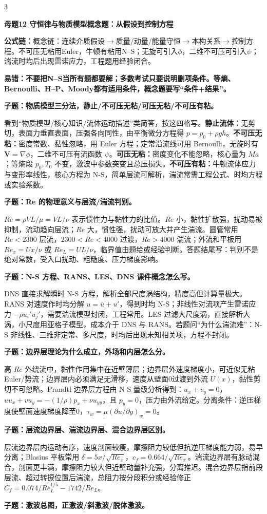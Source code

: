 \documentclass[a4paper]{article}
\newcommand{\mt}[1]{\vspace{0.22pt}\colorbox{M}{\parbox{\dimexpr\linewidth-2\fboxsep}{\color{white}\bfseries #1}}\par}
\newcommand{\qt}[1]{\vspace{0.10pt}\colorbox{Q}{\parbox{\dimexpr\linewidth-2\fboxsep}{\color{white}\bfseries #1}}\par}
\newcommand{\ans}[1]{\colorbox{G}{\parbox{\dimexpr\linewidth-2\fboxsep}{#1}}\par}
\newcommand{\warn}[1]{\colorbox{Y}{\parbox{\dimexpr\linewidth-2\fboxsep}{\color{E}\bfseries #1}}\par}
\newcommand{\form}[1]{{\color{M}\bfseries 公式链：}#1\par}
\begin{document}
\begin{multicols}{3}
\mt{母题12 守恒律与物质模型概念题：从假设到控制方程}
\form{概念链：连续介质假设$\to$质量/动量/能量守恒$\to$本构关系$\to$控制方程。不可压无粘用Euler，牛顿有粘用N--S；无旋可引入$\phi$，二维不可压可引入$\psi$；湍流时均后出现雷诺应力，工程题用经验闭合。}
\warn{易错：不要把N--S当所有题都要解；多数考试只要说明删项条件。等熵、Bernoulli、H--P、Moody都有适用条件，概念题要写“条件+结果”。}
\qt{子题：物质模型三分法，静止/不可压无粘/可压无粘/不可压有粘。}
\ans{看到“物质模型/核心知识/流体运动描述”类简答，按这四格写。\textbf{静止流体：}无剪切，表面力垂直表面，压强各向同性，由平衡微分方程得 $p=p_0+\rho gh$。\textbf{不可压无粘：}密度常数、黏性忽略，用 Euler 方程；定常沿流线可用 Bernoulli，无旋时有 $\bm V=\nabla\phi$，二维不可压有流函数 $\psi$。\textbf{可压无粘：}密度变化不能忽略，核心量为 $Ma$；等熵段 $p_0,T_0$ 不变，激波中参数突变且总压损失。\textbf{不可压有粘：}牛顿流体应力与变形率线性，核心方程为 N-S，简单层流可解析，湍流常需工程公式、时均方程或实验系数。}
\qt{子题：Re 的物理意义与层流/湍流判别。}
\ans{$Re=\rho VL/\mu=VL/\nu$ 表示惯性力与黏性力的比值。$Re$ 小，黏性扩散强，扰动易被抑制，流动趋向层流；$Re$ 大，惯性强，扰动可放大并产生湍流。圆管常用 $Re<2300$ 层流，$2300<Re<4000$ 过渡，$Re>4000$ 湍流；外流和平板用 $Re_x=Ux/\nu$ 或 $Re_L=UL/\nu$，临界值由题给或经验判断。答题结尾写：判别不是绝对常数，受入口扰动、粗糙度、压力梯度影响。}
\qt{子题：N-S 方程、RANS、LES、DNS 课件概念怎么写。}
\ans{DNS 直接求解瞬时 N-S 方程，解析全部尺度涡结构，精度高但计算量极大。RANS 对速度作时均分解 $u=\bar u+u'$，得到时均 N-S；非线性对流项产生雷诺应力 $-\rho\overline{u_i'u_j'}$，需要湍流模型封闭，工程常用。LES 过滤大尺度涡，直接解析大涡，小尺度用亚格子模型，成本介于 DNS 与 RANS。若题问“为什么湍流难”：N-S 非线性、三维非定常、多尺度，时均后出现未知相关项，方程不封闭。}
\qt{子题：边界层理论为什么成立，外场和内层怎么分。}
\ans{高 $Re$ 外绕流中，黏性作用集中在近壁薄层；边界层外速度梯度小，可近似无粘 Euler/势流；边界层内必须满足无滑移，速度从壁面0过渡到外流 $U(x)$，黏性剪切不可忽略。Prandtl 边界层方程由 N-S 量级分析得到：$u_x+v_y=0$，$uu_x+vu_y=-(1/\rho)p_x+\nu u_{yy}$，且 $p_y=0$，压力由外流给定。分离条件：逆压梯度使壁面速度梯度降至0，$\tau_w=\mu(\partial u/\partial y)_w=0$。}
\qt{子题：层流边界层、湍流边界层、混合边界层区别。}
\ans{层流边界层内运动有序，速度剖面较瘦，摩擦阻力较低但抗逆压梯度能力弱，易早分离；Blasius 平板常用 $\delta=5x/\sqrt{Re_x}$，$c_f=0.664/\sqrt{Re_x}$。湍流边界层有脉动混合，剖面更丰满，摩擦阻力较大但近壁动量补充强，分离推迟。混合边界层指前段层流、超过转捩位置后湍流，总阻力按分段积分或经验修正 $\bar C_f=0.074/Re_L^{1/5}-1742/Re_L$。}
\qt{子题：激波总图，正激波/斜激波/脱体激波。}

\end{multicols}
\end{document}
